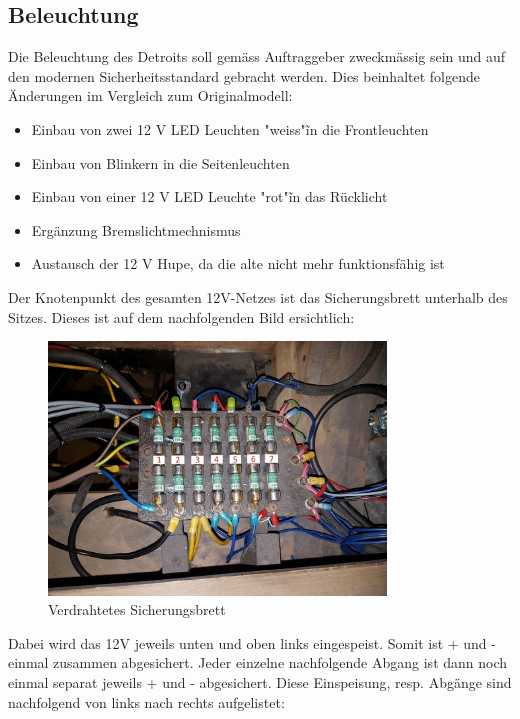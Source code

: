 \subsection{Beleuchtung}

Die Beleuchtung des Detroits soll gemäss Auftraggeber zweckmässig sein und auf den modernen Sicherheitsstandard gebracht werden. Dies beinhaltet folgende Änderungen im Vergleich zum Originalmodell:
\begin{itemize}
\item Einbau von zwei 12 V LED Leuchten "weiss"\~ in die Frontleuchten
\item Einbau von Blinkern in die Seitenleuchten
\item Einbau von einer 12 V LED Leuchte "rot"\~in das Rücklicht
\item Ergänzung Bremslichtmechnismus
\item Austausch der 12 V Hupe, da die alte nicht mehr funktionsfähig ist
\end{itemize}

\color{blue}
Der Knotenpunkt des gesamten 12V-Netzes ist das Sicherungsbrett unterhalb des Sitzes. Dieses ist auf dem nachfolgenden Bild ersichtlich:

\begin{figure}[h!]
	\centering
		\includegraphics[width=0.8\textwidth]{images/Sicherungsbrett}
	\caption{Verdrahtetes Sicherungsbrett}
	\label{fig:Sicherungsbrett}
\end{figure}

\newpage
Dabei wird das 12V jeweils unten und oben links eingespeist. Somit ist + und - einmal zusammen abgesichert. Jeder einzelne nachfolgende Abgang ist dann noch einmal separat jeweils + und - abgesichert. Diese Einspeisung, resp. Abgänge sind nachfolgend von links nach rechts aufgelistet:

